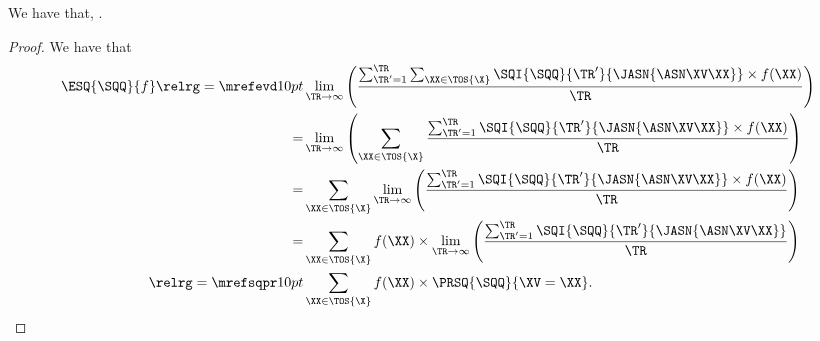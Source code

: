 \begin{proposition}
  We have that, \evsqexprprop.%
\end{proposition}

\begin{proof}
  We have that
  \begin{align*}
    \ESQ{\SQQ}{f} \relrg = {\mrefevd} 10pt &
    \lim_{\TR \rightarrow \infty}\left(\frac{\sum_{\TR' = 1}^{\TR}\sum_{\XX \in \TOS{\X}}\SQI{\SQQ}{\TR'}{\JASN{\ASN\XV\XX}}\times f(\XX)}{\TR}\right)\\
          = & \lim_{\TR \rightarrow \infty}\left(\sum_{\XX \in \TOS{\X}}\frac{\sum_{\TR' = 1}^{\TR}\SQI{\SQQ}{\TR'}{\JASN{\ASN\XV\XX}}\times f(\XX)}{\TR}\right)\\
          = & \sum_{\XX \in \TOS{\X}}\lim_{\TR \rightarrow \infty}\left(\frac{\sum_{\TR' = 1}^{\TR}\SQI{\SQQ}{\TR'}{\JASN{\ASN\XV\XX}}\times f(\XX)}{\TR}\right)\\
          = & \sum_{\XX \in \TOS{\X}}f(\XX) \times \lim_{\TR \rightarrow \infty}\left(\frac{\sum_{\TR' = 1}^{\TR}\SQI{\SQQ}{\TR'}{\JASN{\ASN\XV\XX}}}{\TR}\right)\\
      \relrg = {\mrefsqpr} 10pt & \sum_{\XX \in \TOS{\X}}f(\XX) \times \PRSQ{\SQQ}{\XV = \XX}.
  \end{align*}
\end{proof}
